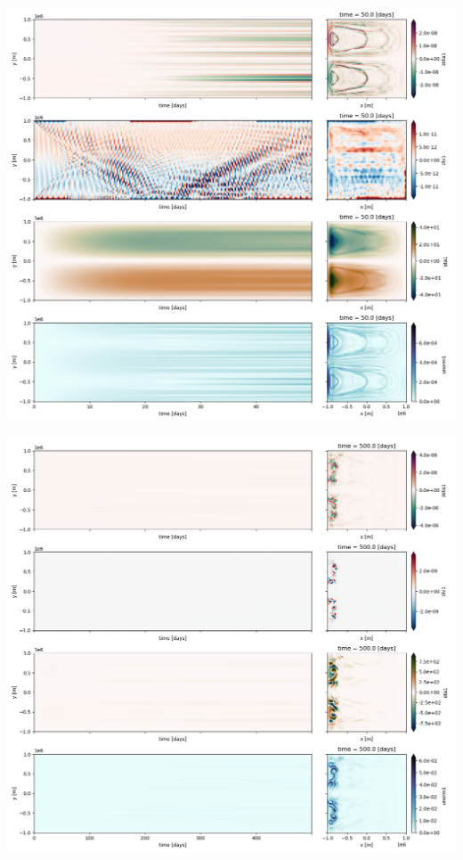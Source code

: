 \documentclass[10pt]{article}
\numberwithin{equation}{section}
\begin{document}
\begin{center}
\includegraphics[width=.9\linewidth]{figures/tests/2023-08-14_hovmoller1_t=50days.png}
\end{center}
\begin{center}
\includegraphics[width=.9\linewidth]{figures/tests/2023-08-14_hovmoller1_t=500days.png}
\end{center}
\end{document}
